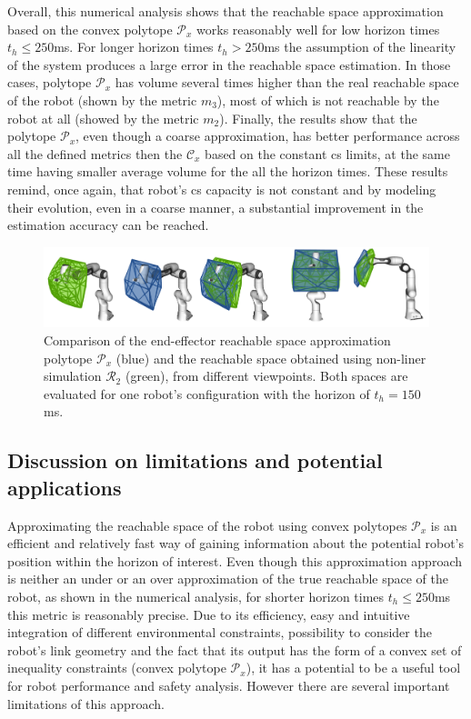 Overall, this numerical analysis shows that the reachable space approximation based on the convex polytope $\mathcal{P}_x$ works reasonably well for low horizon times $t_h\leq250$ms. For longer horizon times $t_h>250$ms the assumption of the linearity of the system produces a large error in the reachable space estimation. In those cases, polytope $\mathcal{P}_x$ has volume several times higher than the real reachable space of the robot (shown by the metric $m_3$), most of which is not reachable by the robot at all (showed by the metric $m_2$). Finally, the results show that the polytope $\mathcal{P}_x$, even though a coarse approximation, has better performance across all the defined metrics then the $\mathcal{C}_x$ based on the constant \gls{cs} limits, at the same time having smaller average volume for the all the horizon times. These results remind, once again, that robot's \gls{cs} capacity is not constant and by modeling their evolution, even in a coarse manner, a substantial improvement in the estimation accuracy can be reached.




\begin{figure}[!t]
    \centering
    \includegraphics[width=\textwidth]{Papers/images/c3.png}
    \caption{Comparison of the end-effector reachable space approximation polytope $\mathcal{P}_x$ (blue) and the reachable space obtained using non-liner simulation $\mathcal{R}_2$ (green), from different viewpoints. Both spaces are evaluated for one robot's configuration with the horizon of $t_h=150$ms. }
    \label{fig:comparisson_simu_convex}
\end{figure}
\subsection{Discussion on limitations and potential applications}
\label{ch:discussion}

Approximating the reachable space of the robot using convex polytopes $\mathcal{P}_x$ is an efficient and relatively fast way of gaining information about the potential robot's position within the horizon of interest. Even though this approximation approach is neither an under or an over approximation of the true reachable space of the robot, as shown in the numerical analysis, for shorter horizon times $t_h\leq250$ms this metric is reasonably precise. Due to its efficiency, easy and intuitive integration of different environmental constraints, possibility to consider the robot's link geometry and the fact that its output has the form of a convex set of inequality constraints (convex polytope $\mathcal{P}_x$), it has a potential to be a useful tool for robot performance and safety analysis. However there are several important limitations of this approach.

